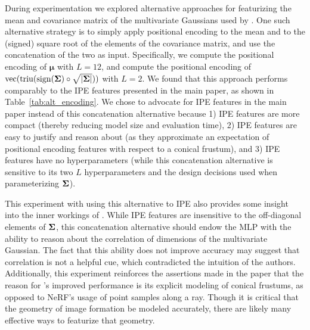 \documentclass[10pt,twocolumn,letterpaper]{article}
\begin{document}
During experimentation we explored alternative approaches for featurizing the mean and covariance matrix of the multivariate Gaussians used by \shortmodelnamelower. One such alternative strategy is to simply apply positional encoding to the mean and to the (signed) square root of the elements of the covariance matrix, and use the concatenation of the two as input. Specifically, we compute the positional encoding of $\boldsymbol{\mu}$ with $L=12$, and compute the positional encoding of $\operatorname{vec}(\operatorname{triu}(\operatorname{sign}(\boldsymbol{\Sigma}) \circ \sqrt{|\boldsymbol{\Sigma}|}))$ with $L=2$. We found that this approach performs comparably to the IPE features presented in the main paper, as shown in Table~\ref{tab:alt_encoding}. We chose to advocate for IPE features in the main paper instead of this concatenation alternative because 1)  IPE features are more compact (thereby reducing model size and evaluation time), 2) IPE features are easy to justify and reason about (as they approximate an expectation of positional encoding features with respect to a conical frustum), and 3) IPE features have no hyperparameters (while this concatenation alternative is sensitive to its two $L$ hyperparameters and the design decisions used when parameterizing $\boldsymbol{\Sigma}$).

This experiment with using this alternative to IPE also provides some insight into the inner workings of \shortmodelnamelower. While IPE features are insensitive to the off-diagonal elements of $\boldsymbol{\Sigma}$, this concatenation alternative should endow the MLP with the ability to reason about the correlation of dimensions of the multivariate Gaussian. The fact that this ability does not improve accuracy may suggest that correlation is not a helpful cue, which contradicted the intuition of the authors. 
Additionally, this experiment reinforces the assertions made in the paper that the reason for \shortmodelnamelower's improved performance is its explicit modeling of conical frustums, as opposed to NeRF's usage of point samples along a ray. Though it is critical that the geometry of image formation be modeled accurately, there are likely many effective ways to featurize that geometry.
\end{document}
